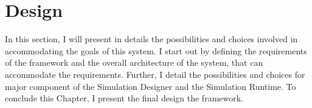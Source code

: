 \chapter{Design}\label{ch:design}
In this section, I will present in details the possibilities and choices involved in accommodating the goals of this system. I start out by defining the requirements of the framework and the overall architecture of the system, that can accommodate the requirements. Further, I detail the possibilities and choices for major component of the Simulation Designer and the Simulation Runtime. To conclude this Chapter, I present the final design the framework.







